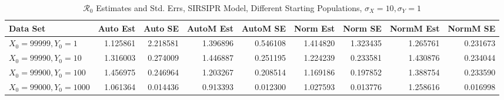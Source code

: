 \documentclass[12pt]{article}
\newcommand{\rr}{\ensuremath{\mathcal{R}_0}}
\begin{document}
\begin{table}[H]
	
	\caption{$\rr$ Estimates and Std. Errs, SIRSIPR Model,
		Different Starting Populations, 
		$\sigma_X = 10, \sigma_Y = 1$}
	\begin{footnotesize}
		\hskip -1.7cm
		\begin{tabular}{l|r|r|r|r|r|r|r|r}
			\hline
			Data Set & Auto Est & Auto SE & AutoM Est & AutoM SE & Norm Est & Norm SE & NormM Est & NormM SE\\
			\hline
			$X_0 = 99999, Y_0 = 1$ & 1.125861 & 2.218581 & 1.396896 & 0.546108 & 1.414820 & 1.323435 & 1.265761 & 0.231673\\
			\hline
			$X_0 = 99990, Y_0 = 10$ & 1.316003 & 0.274009 & 1.446887 & 0.251195 & 1.224239 & 0.233581 & 1.430876 & 0.234044\\
			\hline
			$X_0 = 99900, Y_0 = 100$ & 1.456975 & 0.246964 & 1.203267 & 0.208514 & 1.169186 & 0.197852 & 1.388754 & 0.233590\\
			\hline
			$X_0 = 99000, Y_0 = 1000$ & 1.061364 & 0.014436 & 0.913393 & 0.012300 & 1.027593 & 0.013776 & 1.258616 & 0.016998\\
			\hline
		\end{tabular}
	\end{footnotesize}
\end{table}
\end{document}
